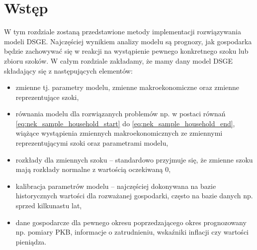 \section{Wstęp}

W tym rozdziale zostaną przedstawione metody implementacji rozwiązywania modeli DSGE. Najczęściej wynikiem analizy modelu są prognozy, jak gospodarka będzie zachowywać się w reakcji na wystąpienie pewnego konkretnego szoku lub zbioru szoków. W całym rozdziale zakładamy, że mamy dany model DSGE składający się z następujących elementów:
\begin{itemize}
    \item zmienne tj. parametry modelu, zmienne makroekonomiczne oraz zmienne reprezentujące szoki,
    \item równania modelu dla rozwiązanych problemów np. w postaci równań \eqref{eq:nek_sample_household_start} do \eqref{eq:nek_sample_household_end}, wiążące wystąpienia zmiennych makroekonomicznych ze zmiennymi reprezentującymi szoki oraz parametrami modelu,
    \item rozkłady dla zmiennych szoku -- standardowo przyjmuje się, że zmienne szoku mają rozkłady normalne z wartością oczekiwaną $0$,
    \item kalibracja parametrów modelu -- najczęściej dokonywana na bazie historycznych wartości dla rozważanej gospodarki, często na bazie danych np. sprzed kilkunastu lat,
    \item dane gospodarcze dla pewnego okresu poprzedzającego okres prognozowany np. pomiary PKB, informacje o zatrudnieniu, wskaźniki inflacji czy wartości pieniądza.
\end{itemize}


